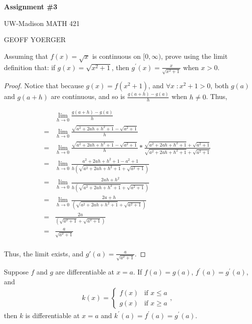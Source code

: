 \documentclass{article} %
\theoremstyle{plain}
\theoremstyle{definition}
\begin{document}
\begin{center}
    \Large{
        \textbf{Assignment \#3}

        UW-Madison MATH 421
    }
    
    \vspace{5pt}
        
    \normalsize{
        GEOFF YOERGER

        \usdate
    }
    
    \vspace{15pt}
\end{center}


\noindent{} Assuming that $f(x) =\sqrt{x}$ is continuous on $[0,\infty)$, prove using the limit definition that: if $g(x) = \sqrt{x^2+1}$, then $g^\prime(x) = \frac{x}{\sqrt{x^2+1}}$ when $x > 0$. 

\begin{proof}
    Notice that because $g(x) = f(x^2 + 1)$, and $\forall x \; \colon x^2 + 1 > 0$, both $g(a)$ and $g(a+h)$ are continuous, and so is $\frac{g(a+h) - g(a)}{h}$ when $h \neq 0$. Thus,

    \begin{align*}
        & \lim_{h \to 0} \frac{g(a+h) - g(a)}{h} \\
        = & \lim_{h \to 0} \frac{\sqrt{a^2 + 2ah + h^2 + 1} - \sqrt{a^2 + 1}}{h} \\
        = & \lim_{h \to 0} \frac{\sqrt{a^2 + 2ah + h^2 + 1} - \sqrt{a^2 + 1}}{h} * \frac{\sqrt{a^2 + 2ah + h^2 + 1} + \sqrt{a^2 + 1}}{\sqrt{a^2 + 2ah + h^2 + 1} + \sqrt{a^2 + 1}} \\
        = & \lim_{h \to 0} \frac{a^2 + 2ah + h^2 + 1 - a^2 + 1}{h  (\sqrt{a^2 + 2ah + h^2 + 1} + \sqrt{a^2 + 1})} \\
        = & \lim_{h \to 0} \frac{2ah + h^2}{h  (\sqrt{a^2 + 2ah + h^2 + 1} + \sqrt{a^2 + 1})} \\
        = & \lim_{h \to 0} \frac{2a + h}{(\sqrt{a^2 + 2ah + h^2 + 1} + \sqrt{a^2 + 1})} \\
        = & \frac{2a}{(\sqrt{a^2 + 1} + \sqrt{a^2 + 1})} \\
        = & \frac{a}{\sqrt{a^2 + 1}} \\
    \end{align*}

    Thus, the limit exists, and $g'(a) = \frac{a}{\sqrt{a^2 + 1}}$.
\end{proof}

\noindent{} Suppose $f$ and $g$ are differentiable at $x=a$. If $f(a) = g(a)$, $f^\prime(a) = g^\prime(a)$, and 
\begin{align*}
k(x) = \begin{cases} 
f(x) & \text{if } x \leq a \\
g(x) & \text{if } x \geq a
\end{cases},
\end{align*}
then $k$ is differentiable at $x=a$ and $k^\prime(a) =f^\prime(a)=g^\prime(a)$.  
\end{document}
